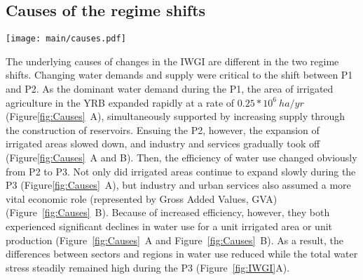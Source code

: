 \documentclass[draft]{../agujournal2019}
\begin{document}
\subsection{Causes of the regime shifts}\label{Res.2}

\begin{figure*}[th!]
	\centering
	\texttt{[image: main/causes.pdf]}
	\caption{
		Causes of water governance regime shifts in the YRB.\
		\textbf{A.} Changes in the total irrigated area (orange line) and water use intensity ($WU/A$, water use divided by the irrigated area, the green dot line).
		\textbf{B.} Changes in gross values added (GVA) of industry and services (blue line) and their water use intensities ($WU/GVA$ WU divided by the GVA, the red dot line).
		\textbf{C.} Completed time of each new reservoir and their located region's water use (LWU) percentages as a proportion of the total basinal water use (BWU) at that time. Dashed lines denote average of these percentages in different regimes. Red circles (Major Reservoirs) denote the reservoirs mainly for managing and regulating the whole basin.
		The size of each circle indicates the magnitude of its water storage capacity.
		\textbf{D.} Social atmosphere$^*$ (red triangles) and national-level governance policies (the circles, different colours denote signed by different state agencies). The light grey bars count official documents related to the YRB on a basinal scale (the Yellow River Events).
		\footnotesize{$^*$ Social atmosphere refers to the sociocultural context in which people live or in which something happens, including the culture that the individual was educated or lives.}
	}\label{fig:Causes}
\end{figure*}

The underlying causes of changes in the IWGI are different in the two regime shifts.
Changing water demands and supply were critical to the shift between P1 and P2.
As the dominant water demand during the P1, the area of irrigated agriculture in the YRB expanded rapidly at a rate of $0.25*10^6~ha/yr$ (Figure\ref{fig:Causes}~A), simultaneously supported by increasing supply through the construction of reservoirs.
Ensuing the P2, however, the expansion of irrigated areas slowed down, and industry and services gradually took off (Figure\ref{fig:Causes}~A and B).
Then, the efficiency of water use changed obviously from P2 to P3.
Not only did irrigated areas continue to expand slowly during the P3 (Figure\ref{fig:Causes}~A), but industry and urban services also assumed a more vital economic role (represented by Gross Added Values, GVA) (Figure~\ref{fig:Causes}~B).
Because of increased efficiency, however, they both experienced significant declines in water use for a unit irrigated area or unit production (Figure~\ref{fig:Causes}~A and Figure~\ref{fig:Causes}~B).
As a result, the differences between sectors and regions in water use reduced while the total water stress steadily remained high during the P3 (Figure~\ref{fig:IWGI}A).
\end{document}
